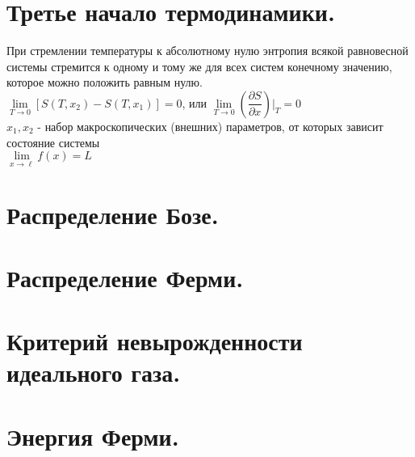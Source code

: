 \begin{multicols*}{2}
		\section{Третье начало термодинамики.}
		При стремлении температуры к абсолютному  нулю энтропия всякой равновесной системы стремится к одному и тому же для всех систем конечному значению, которое можно положить равным нулю.\\
		$\lim\limits_{T\to 0} [ S(T, x_2) - S(T, x_1)] =0$, или $\lim\limits_{T\to 0} (\dfrac{\partial S}{\partial x})\vert _T = 0$\\
		$x_1, x_2$ - набор макроскопических (внешних) параметров, от которых зависит состояние системы\\
		$\lim\limits_{x \to \ell }f(x)=L$

		\section{Распределение Бозе.}

		\section{Распределение Ферми.}

		\section{Критерий невырожденности идеального газа.}

		\section{Энергия Ферми.}

	\end{multicols*}

